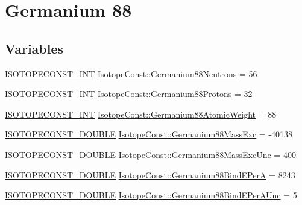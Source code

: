 \hypertarget{group___isotope_const-_germanium-_ge88}{}\section{Germanium 88}
\label{group___isotope_const-_germanium-_ge88}
\subsection*{Variables}
\begin{DoxyCompactItemize}
\item 
\mbox{\hyperlink{group___isotope_const-_macros_ga5f18360b3e99483a35c32d789e62621c}{I\+S\+O\+T\+O\+P\+E\+C\+O\+N\+S\+T\+\_\+\+I\+NT}} \mbox{\hyperlink{group___isotope_const-_germanium-_ge88_gad0ae069857a55ac89ec8db69f98fff0b}{Isotope\+Const\+::\+Germanium88\+Neutrons}} = 56
\item 
\mbox{\hyperlink{group___isotope_const-_macros_ga5f18360b3e99483a35c32d789e62621c}{I\+S\+O\+T\+O\+P\+E\+C\+O\+N\+S\+T\+\_\+\+I\+NT}} \mbox{\hyperlink{group___isotope_const-_germanium-_ge88_ga199e6a691bb81a9f4c43a4ff8adb1c36}{Isotope\+Const\+::\+Germanium88\+Protons}} = 32
\item 
\mbox{\hyperlink{group___isotope_const-_macros_ga5f18360b3e99483a35c32d789e62621c}{I\+S\+O\+T\+O\+P\+E\+C\+O\+N\+S\+T\+\_\+\+I\+NT}} \mbox{\hyperlink{group___isotope_const-_germanium-_ge88_ga5166c2b3694e1dfc4cfc98211d985df3}{Isotope\+Const\+::\+Germanium88\+Atomic\+Weight}} = 88
\item 
\mbox{\hyperlink{group___isotope_const-_macros_ga8f45a7272ce02c0b4c65c44636ed719a}{I\+S\+O\+T\+O\+P\+E\+C\+O\+N\+S\+T\+\_\+\+D\+O\+U\+B\+LE}} \mbox{\hyperlink{group___isotope_const-_germanium-_ge88_ga4611388040ec487d80b50fa99517de0f}{Isotope\+Const\+::\+Germanium88\+Mass\+Exc}} = -\/40138
\item 
\mbox{\hyperlink{group___isotope_const-_macros_ga8f45a7272ce02c0b4c65c44636ed719a}{I\+S\+O\+T\+O\+P\+E\+C\+O\+N\+S\+T\+\_\+\+D\+O\+U\+B\+LE}} \mbox{\hyperlink{group___isotope_const-_germanium-_ge88_gafa4f417dee8983157059a18a68a5b4c4}{Isotope\+Const\+::\+Germanium88\+Mass\+Exc\+Unc}} = 400
\item 
\mbox{\hyperlink{group___isotope_const-_macros_ga8f45a7272ce02c0b4c65c44636ed719a}{I\+S\+O\+T\+O\+P\+E\+C\+O\+N\+S\+T\+\_\+\+D\+O\+U\+B\+LE}} \mbox{\hyperlink{group___isotope_const-_germanium-_ge88_ga94aa4a10b76e2289dca6f7ca13d81d14}{Isotope\+Const\+::\+Germanium88\+Bind\+E\+PerA}} = 8243
\item 
\mbox{\hyperlink{group___isotope_const-_macros_ga8f45a7272ce02c0b4c65c44636ed719a}{I\+S\+O\+T\+O\+P\+E\+C\+O\+N\+S\+T\+\_\+\+D\+O\+U\+B\+LE}} \mbox{\hyperlink{group___isotope_const-_germanium-_ge88_ga51010c13a03a2fb4d2557e2249fff6d0}{Isotope\+Const\+::\+Germanium88\+Bind\+E\+Per\+A\+Unc}} = 5

\end{DoxyCompactItemize}
